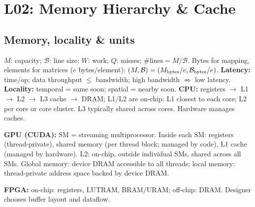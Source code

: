 \section{L02: Memory Hierarchy \& Cache}
\subsection{Memory, locality \& units}
$M$: capacity; $\mathcal B$: line size; $W$: work; $Q$: misses;
$\#\text{lines}=M/\mathcal B$.
Bytes for mapping, elements for matrices ($e$ bytes/element):
$(M,\mathcal B)=(M_{\rm bytes}/e,\mathcal B_{\rm bytes}/e)$.
\textbf{Latency:} time/op; data throughput $\le$ bandwidth;
high bandwidth $\not\Rightarrow$ low latency.
\textbf{Locality:} temporal = same soon; spatial = nearby soon.
\textbf{CPU:} registers $\to$ L1 $\to$ L2 $\to$ L3 cache $\to$ DRAM;
L1/L2 are on-chip: L1 closest to each core; L2 per core or core cluster.
L3 typically shared across cores. Hardware manages caches.\par
\begin{samepage}
\textbf{GPU (CUDA):} SM = streaming multiprocessor.
Inside each SM: registers (thread-private), shared memory
(per thread block; managed by code), L1 cache (managed by hardware).
L2: on-chip, outside individual SMs, shared across all SMs.
Global memory: device DRAM accessible to all threads;
local memory: thread-private address space backed by device DRAM.\par
\end{samepage}
\begin{samepage}
\textbf{FPGA:} on-chip: registers, LUTRAM, BRAM/URAM;
off-chip: DRAM. Designer chooses buffer layout and dataflow.\par
\end{samepage}

